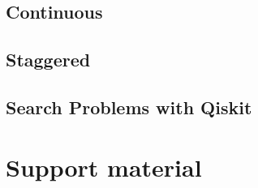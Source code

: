 \documentclass[
oneside,
11pt, a4paper,
footinclude=true,
headinclude=true,
cleardoublepage=empty
]{scrbook}
\begin{document}
\section{Continuous}

\section{Staggered}
\section{Search Problems with Qiskit}










\chapter{Support material}
\end{document}
